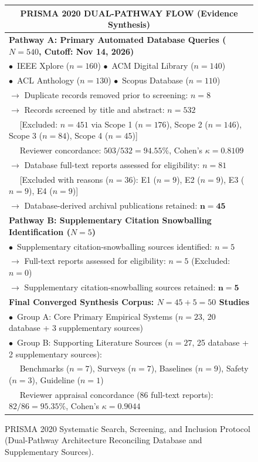 \documentclass[conference,a4paper]{IEEEtran}
\begin{document}
\begin{figure}[htbp]
\centering
\scriptsize
\begin{tabularx}{\columnwidth}{|X|}
\hline
\multicolumn{1}{|c|}{\textbf{PRISMA 2020 DUAL-PATHWAY FLOW (Evidence Synthesis)}} \\
\hline
\textbf{Pathway A: Primary Automated Database Queries ($N = 540$, Cutoff: Nov 14, 2026)} \\
$\bullet$~IEEE Xplore ($n = 160$) \quad $\bullet$~ACM Digital Library ($n = 140$) \\
$\bullet$~ACL Anthology ($n = 130$) \quad $\bullet$~Scopus Database ($n = 110$) \\
$\longrightarrow$ Duplicate records removed prior to screening: $n = 8$ \\
$\longrightarrow$ Records screened by title and abstract: $n = 532$ \\
$\quad$ [Excluded: $n = 451$ via Scope 1 ($n=176$), Scope 2 ($n=146$), Scope 3 ($n=84$), Scope 4 ($n=45$)] \\
$\quad$ Reviewer concordance: $503/532 = 94.55\%$, Cohen's $\kappa = 0.8109$ \\
$\longrightarrow$ Database full-text reports assessed for eligibility: $n = 81$ \\
$\quad$ [Excluded with reasons ($n = 36$): E1 ($n=9$), E2 ($n=9$), E3 ($n=9$), E4 ($n=9$)] \\
$\longrightarrow$ Database-derived archival publications retained: $\mathbf{n = 45}$ \\
\hline
\textbf{Pathway B: Supplementary Citation Snowballing Identification ($N = 5$)} \\
$\bullet$~Supplementary citation-snowballing sources identified: $n = 5$ \\
$\longrightarrow$ Full-text reports assessed for eligibility: $n = 5$ (Excluded: $n = 0$) \\
$\longrightarrow$ Supplementary citation-snowballing sources retained: $\mathbf{n = 5}$ \\
\hline
\textbf{Final Converged Synthesis Corpus: $N = 45 + 5 = 50$ Studies} \\
$\bullet$~Group A: Core Primary Empirical Systems ($n = 23$, 20 database + 3 supplementary sources) \\
$\bullet$~Group B: Supporting Literature Sources ($n = 27$, 25 database + 2 supplementary sources): \\
$\quad$ Benchmarks ($n = 7$), Surveys ($n = 7$), Baselines ($n = 9$), Safety ($n = 3$), Guideline ($n = 1$) \\
$\quad$ Reviewer appraisal concordance (86 full-text reports): $82/86 = 95.35\%$, Cohen's $\kappa = 0.9044$ \\
\hline
\end{tabularx}
\vspace{2pt}
\caption{PRISMA 2020 Systematic Search, Screening, and Inclusion Protocol (Dual-Pathway Architecture Reconciling Database and Supplementary Sources).}
\label{fig:prisma_flow}
\end{figure}
\end{document}

